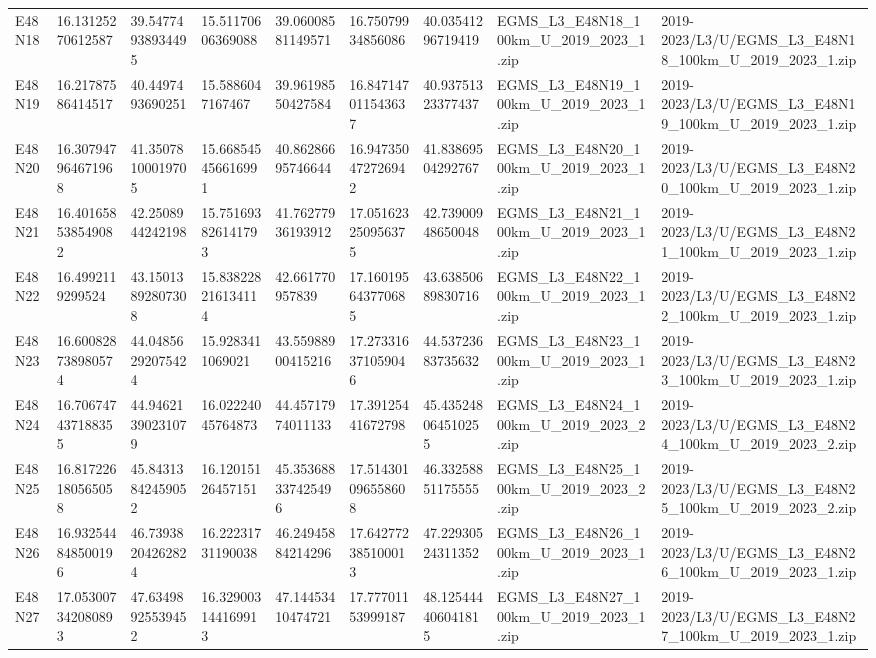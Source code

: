 \begin{landscape}
\begin{longtable}{lllllllll}
E48N18 & 16.13125270612587 & 39.54774938934495 & 15.51170606369088 & 39.06008581149571 & 16.75079934856086 & 40.03541296719419 & EGMS\_L3\_E48N18\_100km\_U\_2019\_2023\_1.zip & 2019-2023/L3/U/EGMS\_L3\_E48N18\_100km\_U\_2019\_2023\_1.zip \\
E48N19 & 16.21787586414517 & 40.4497493690251 & 15.5886047167467 & 39.96198550427584 & 16.847147011543637 & 40.93751323377437 & EGMS\_L3\_E48N19\_100km\_U\_2019\_2023\_1.zip & 2019-2023/L3/U/EGMS\_L3\_E48N19\_100km\_U\_2019\_2023\_1.zip \\
E48N20 & 16.307947964671968 & 41.35078100019705 & 15.668545456616991 & 40.86286695746644 & 16.947350472726942 & 41.83869504292767 & EGMS\_L3\_E48N20\_100km\_U\_2019\_2023\_1.zip & 2019-2023/L3/U/EGMS\_L3\_E48N20\_100km\_U\_2019\_2023\_1.zip \\
E48N21 & 16.401658538549082 & 42.2508944242198 & 15.751693826141793 & 41.76277936193912 & 17.051623250956375 & 42.73900948650048 & EGMS\_L3\_E48N21\_100km\_U\_2019\_2023\_1.zip & 2019-2023/L3/U/EGMS\_L3\_E48N21\_100km\_U\_2019\_2023\_1.zip \\
E48N22 & 16.4992119299524 & 43.15013892807308 & 15.838228216134114 & 42.661770957839 & 17.160195643770685 & 43.63850689830716 & EGMS\_L3\_E48N22\_100km\_U\_2019\_2023\_1.zip & 2019-2023/L3/U/EGMS\_L3\_E48N22\_100km\_U\_2019\_2023\_1.zip \\
E48N23 & 16.600828738980574 & 44.04856292075424 & 15.9283411069021 & 43.55988900415216 & 17.273316371059046 & 44.53723683735632 & EGMS\_L3\_E48N23\_100km\_U\_2019\_2023\_1.zip & 2019-2023/L3/U/EGMS\_L3\_E48N23\_100km\_U\_2019\_2023\_1.zip \\
E48N24 & 16.706747437188355 & 44.94621390231079 & 16.02224045764873 & 44.45717974011133 & 17.39125441672798 & 45.435248064510255 & EGMS\_L3\_E48N24\_100km\_U\_2019\_2023\_2.zip & 2019-2023/L3/U/EGMS\_L3\_E48N24\_100km\_U\_2019\_2023\_2.zip \\
E48N25 & 16.817226180565058 & 45.84313842459052 & 16.12015126457151 & 45.353688337425496 & 17.514301096558608 & 46.33258851175555 & EGMS\_L3\_E48N25\_100km\_U\_2019\_2023\_2.zip & 2019-2023/L3/U/EGMS\_L3\_E48N25\_100km\_U\_2019\_2023\_2.zip \\
E48N26 & 16.932544848500196 & 46.73938204262824 & 16.22231731190038 & 46.24945884214296 & 17.642772385100013 & 47.22930524311352 & EGMS\_L3\_E48N26\_100km\_U\_2019\_2023\_1.zip & 2019-2023/L3/U/EGMS\_L3\_E48N26\_100km\_U\_2019\_2023\_1.zip \\
E48N27 & 17.053007342080893 & 47.63498925539452 & 16.329003144169913 & 47.14453410474721 & 17.77701153999187 & 48.125444406041815 & EGMS\_L3\_E48N27\_100km\_U\_2019\_2023\_1.zip & 2019-2023/L3/U/EGMS\_L3\_E48N27\_100km\_U\_2019\_2023\_1.zip \\

\end{longtable}
\end{landscape}
